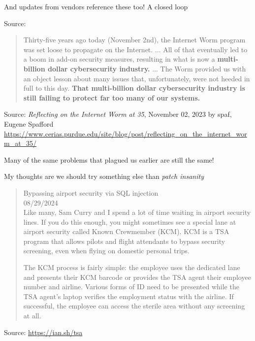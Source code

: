 \documentclass[Screen16to9,17pt]{foils}
\begin{document}
\centerline{And updates from vendors reference these too! A closed loop}





Source:





\begin{quote}
Thirty-five years ago today (November 2nd), the Internet Worm program was set loose to propagate on the Internet.
...
 All of that eventually led to a boom in add-on security measures, resulting in what is now a {\bf multi-billion dollar cybersecurity industry.}
...
The Worm provided us with an object lesson about many issues that, unfortunately, were not heeded in full to this day. {\bf That multi-billion dollar cybersecurity industry is still failing to protect far too many of our systems.}
\end{quote}
Source: \emph{Reflecting on the Internet Worm at 35}, November 02, 2023 by spaf, Eugene Spafford\\
\url{https://www.cerias.purdue.edu/site/blog/post/reflecting_on_the_internet_worm_at_35/}

\begin{list2}
\item Many of the same problems that plagued us earlier are still the same!
\item My thoughts are we should try something else than \emph{patch insanity}
\end{list2}




\begin{quote}
{\large Bypassing airport security via SQL injection}\\
08/29/2024\\
Like many, Sam Curry and I spend a lot of time waiting in airport security lines. If you do this enough, you might sometimes see a special lane at airport security called Known Crewmember (KCM). KCM is a TSA program that allows pilots and flight attendants to bypass security screening, even when flying on domestic personal trips.

The KCM process is fairly simple: the employee uses the dedicated lane and presents their KCM barcode or provides the TSA agent their employee number and airline. Various forms of ID need to be presented while the TSA agent’s laptop verifies the employment status with the airline. If successful, the employee can access the sterile area without any screening at all.
\end{quote}
Source: \url{https://ian.sh/tsa}
\end{document}
